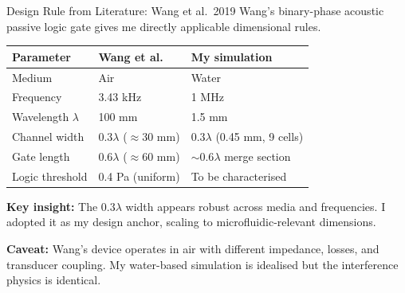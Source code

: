 \documentclass[aspectratio=169,11pt]{beamer}
\begin{document}
\begin{frame}{Design Rule from Literature: Wang et al.\ 2019}
  Wang's binary-phase acoustic passive logic gate gives me directly applicable dimensional rules.

  \vspace{0.2cm}
  \begin{table}
    \centering
    \footnotesize
    \renewcommand{\arraystretch}{1.05}
    \begin{tabular}{@{}lll@{}}
      \toprule
      \textbf{Parameter} & \textbf{Wang et al.} & \textbf{My simulation} \\
      \midrule
      Medium & Air & Water \\
      Frequency & 3.43 kHz & 1 MHz \\
      Wavelength $\lambda$ & 100 mm & 1.5 mm \\
      Channel width & $0.3\lambda$ ($\approx$30 mm) & $0.3\lambda$ (0.45 mm, 9 cells) \\
      Gate length & $0.6\lambda$ ($\approx$60 mm) & $\sim$0.6$\lambda$ merge section \\
      Logic threshold & 0.4 Pa (uniform) & To be characterised \\
      \bottomrule
    \end{tabular}
  \end{table}

  \vspace{0.1cm}
  \textbf{Key insight:} The $0.3\lambda$ width appears robust across media and frequencies. I adopted it as my design anchor, scaling to microfluidic-relevant dimensions.

  \vspace{0.1cm}
  \textcolor{gdpBurgundy}{\small \textbf{Caveat:} Wang's device operates in air with different impedance, losses, and transducer coupling. My water-based simulation is idealised but the interference physics is identical.}
\end{frame}
\end{document}

